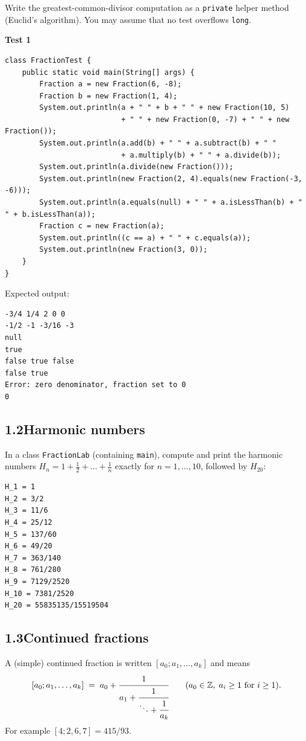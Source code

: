 \documentclass[11pt,a4paper]{article}
\newcommand{\code}[1]{\lstinline[basicstyle=\ttfamily\normalsize,basewidth=0.5em]{#1}}
\newcommand{\spec}[1]{\par\smallskip\textbf{#1}\par}
\begin{document}
Write the greatest-common-divisor computation as a \code{private} helper
method (Euclid's algorithm). You may assume that no test overflows \code{long}.

\spec{Test 1}
\begin{lstlisting}
class FractionTest {
    public static void main(String[] args) {
        Fraction a = new Fraction(6, -8);
        Fraction b = new Fraction(1, 4);
        System.out.println(a + " " + b + " " + new Fraction(10, 5)
                           + " " + new Fraction(0, -7) + " " + new Fraction());
        System.out.println(a.add(b) + " " + a.subtract(b) + " "
                           + a.multiply(b) + " " + a.divide(b));
        System.out.println(a.divide(new Fraction()));
        System.out.println(new Fraction(2, 4).equals(new Fraction(-3, -6)));
        System.out.println(a.equals(null) + " " + a.isLessThan(b) + " " + b.isLessThan(a));
        Fraction c = new Fraction(a);
        System.out.println((c == a) + " " + c.equals(a));
        System.out.println(new Fraction(3, 0));
    }
}
\end{lstlisting}
Expected output:
\begin{lstlisting}[style=out]
-3/4 1/4 2 0 0
-1/2 -1 -3/16 -3
null
true
false true false
false true
Error: zero denominator, fraction set to 0
0
\end{lstlisting}

\subsection*{1.2\quad Harmonic numbers}

In a class \code{FractionLab} (containing \code{main}), compute and print the
harmonic numbers $H_n = 1 + \frac12 + \dots + \frac1n$ exactly for
$n = 1,\dots,10$, followed by $H_{20}$:
\begin{lstlisting}[style=out]
H_1 = 1
H_2 = 3/2
H_3 = 11/6
H_4 = 25/12
H_5 = 137/60
H_6 = 49/20
H_7 = 363/140
H_8 = 761/280
H_9 = 7129/2520
H_10 = 7381/2520
H_20 = 55835135/15519504
\end{lstlisting}

\subsection*{1.3\quad Continued fractions}

A (simple) continued fraction is written $[a_0; a_1, \dots, a_k]$ and means
\[
  [a_0; a_1, \dots, a_k] \;=\; a_0 + \cfrac{1}{a_1 + \cfrac{1}{\ddots + \cfrac{1}{a_k}}}
  \qquad (a_0 \in \mathbb{Z},\; a_i \geq 1 \text{ for } i \geq 1).
\]
For example $[4; 2, 6, 7] = 415/93$.
\end{document}

